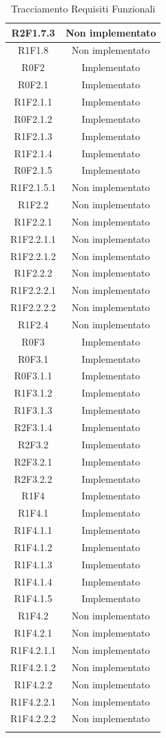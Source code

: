 \begin{longtable}{|c|c|}
	\hline
	R2F1.7.3 & Non implementato\\
	\hline
	R1F1.8 & Non implementato\\
	\hline
	R0F2 & Implementato\\
	\hline
	R0F2.1 & Implementato\\
	\hline
	R1F2.1.1 & Implementato\\
	\hline
	R0F2.1.2 & Implementato\\
	\hline
	R1F2.1.3 & Implementato\\
	\hline
	R1F2.1.4 & Implementato\\
	\hline
	R0F2.1.5 & Implementato\\
	\hline
	R1F2.1.5.1 & Non implementato\\
	\hline
	R1F2.2 & Non implementato\\
	\hline
	R1F2.2.1 & Non implementato\\
	\hline
	R1F2.2.1.1 & Non implementato\\
	\hline
	R1F2.2.1.2 & Non implementato\\
	\hline
	R1F2.2.2 & Non implementato\\
	\hline
	R1F2.2.2.1 & Non implementato\\
	\hline
	R1F2.2.2.2 & Non implementato\\
	\hline
	R1F2.4 & Non implementato\\
	\hline
	R0F3 & Implementato\\
	\hline
	R0F3.1 & Implementato\\
	\hline
	R0F3.1.1 & Implementato\\
	\hline
	R1F3.1.2 & Implementato\\
	\hline
	R1F3.1.3 & Implementato\\
	\hline
	R2F3.1.4 & Implementato\\
	\hline
	R2F3.2 & Implementato\\
	\hline
	R2F3.2.1 & Implementato\\
	\hline
	R2F3.2.2 & Implementato\\
	\hline
	R1F4 & Implementato\\
	\hline
	R1F4.1 & Implementato\\
	\hline
	R1F4.1.1 & Implementato\\
	\hline
	R1F4.1.2 & Implementato\\
	\hline
	R1F4.1.3 & Implementato\\
	\hline
	R1F4.1.4 & Implementato\\
	\hline
	R1F4.1.5 & Implementato\\
	\hline
	R1F4.2 & Non implementato\\
	\hline
	R1F4.2.1 & Non implementato\\
	\hline
	R1F4.2.1.1 & Non implementato\\
	\hline
	R1F4.2.1.2 & Non implementato\\
	\hline
	R1F4.2.2 & Non implementato\\
	\hline
	R1F4.2.2.1 & Non implementato\\
	\hline
	R1F4.2.2.2 & Non implementato\\
	\hline
	\caption[Tracciamento Requisiti Funzionali]{Tracciamento Requisiti Funzionali}
\end{longtable}

